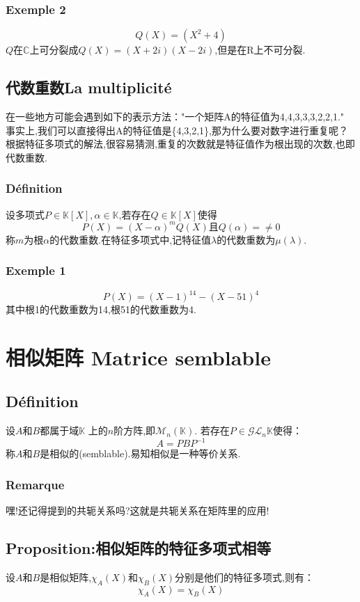\documentclass[12pt, a4paper, oneside]{ctexbook}
\newcommand{\n }{$n$}\newcommand{\f  }{$ f $}
\begin{document}
  \subsubsection{Exemple 2}
  $$
    Q(X)=(X^2+4)
  $$
  $Q$在$\mathbb {C} $上可分裂成$Q(X)=(X+2i)(X-2i)$,但是在R上不可分裂.
  \subsection{代数重数La multiplicité}
  在一些地方可能会遇到如下的表示方法："一个矩阵A的特征值为4,4,3,3,3,2,2,1."
  事实上,我们可以直接得出A的特征值是\{4,3,2,1\},那为什么要对数字进行重复呢？
  根据特征多项式的解法,很容易猜测,重复的次数就是特征值作为根出现的次数,也即代数重数.
  \subsubsection{Définition}
  设多项式$P\in\mathbb {K} [X], \alpha\in\mathbb {K}$,若存在$Q\in\mathbb {K} [X]$使得
  $$
    P(X)=(X-\alpha)^mQ(X)\mbox{且}Q(\alpha)=\neq 0
  $$
  称$m$为根$\alpha$的代数重数.在特征多项式中,记特征值$\lambda$的代数重数为$\mu(\lambda)$.
  \subsubsection{Exemple 1}
  $$
  P(X)=(X-1)^{14}-(X-51)^4
  $$
  其中根1的代数重数为14,根51的代数重数为4.
\section{相似矩阵 Matrice semblable}
  \subsection{Définition}
  设$A$和$B$都属于域$\mathbb {K}$ 上的\n 阶方阵,即$\mathcal{M}_n(\mathbb{K})$.
  若存在$P\in\mathcal{G} \mathcal{L} _n\mathbb{K}$使得：
  $$
    A=PBP^{-1}
  $$
  称$A$和$B$是相似的(semblable).易知相似是一种等价关系.
  \subsubsection{Remarque}
  嘿!还记得提到的共轭关系吗?这就是共轭关系在矩阵里的应用!
  \subsection{Proposition:相似矩阵的特征多项式相等}
  设$A$和$B$是相似矩阵,$\chi_A(X)$和$\chi_B(X)$分别是他们的特征多项式,则有：
  $$
  \chi_A(X)=\chi_B(X)
  $$
\end{document}
